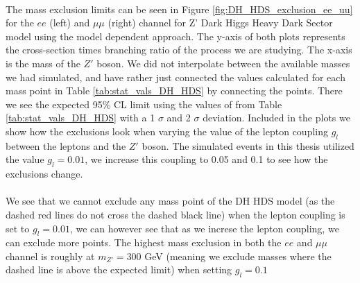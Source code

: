 \documentclass[12pt, a4paper]{book}
\begin{document}
\\The mass exclusion limits can be seen in Figure \ref{fig:DH_HDS_exclusion_ee_uu} for the $ee$ (left) and $\mu\mu$ (right) channel for Z' Dark Higgs Heavy Dark Sector model using the model dependent approach. The y-axis of both plots represents the cross-section times branching ratio of the process we are studying. 
The x-axis is the mass of the $Z'$ boson. We did not interpolate between the available masses we had simulated, and have rather just connected the values calculated for each mass point in Table \ref{tab:stat_vals_DH_HDS} by connecting the points. There we see the expected 95\% CL limit using 
the values of from Table \ref{tab:stat_vals_DH_HDS} with a 1 $\sigma$ and 2 $\sigma$ deviation. Included in the plots we show how the exclusions look when varying the value of the lepton coupling $g_l$ between the leptons and the $Z'$ boson. The simulated events in this thesis utilized the value $g_l=0.01$, 
we increase this coupling to 0.05 and 0.1 to see how the exclusions change.\\
\\We see that we cannot exclude any mass point of the DH HDS model (as the dashed red lines do not cross the dashed black line) when the lepton coupling is set to $g_l=0.01$, we can however see that as we increse the lepton coupling, 
we can exclude more points. The highest mass exclusion in both the $ee$ and $\mu\mu$ channel is roughly at $m_{Z'}=300$ GeV (meaning we exclude masses where the dashed line is above the expected limit) when setting $g_{l}=0.1$
\clearpage
\end{document}
